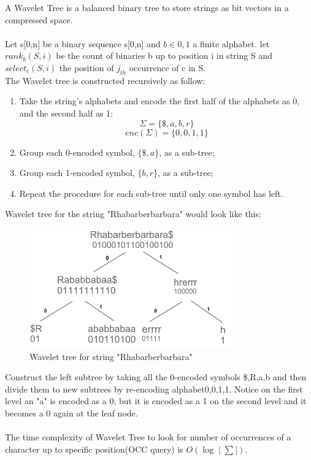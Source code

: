 \documentclass[11pt,a4paper]{report}
\begin{document}
A Wavelet Tree is a balanced binary tree to store strings as bit vectors in a 
compressed space\cite{navarroWavelet}\cite{Wavthesis}\cite{AlexBowe}.\\\\
Let s[0,n] be a binary sequence s[0,n] and $b \in {0,1}$ a finite alphabet. 
let $ rank_{b}(S, i)$ be the count of binaries b up to position i in string S 
and $ select_{c}(S,i)$  the position of $j_{th}$ occurrence of c in S.\\
The Wavelet tree is constructed recursively as follow:
\begin{enumerate}
    \item
		Take the string's alphabets and encode the first half of the alphabets as 0, and the second half as 1\cite {AlexBowe}:
    		$$\Sigma = \{ \$, a, b, r \}$$
			$$enc(\Sigma) = \{ 0, 0, 1, 1 \}$$
    \item
		Group each 0-encoded symbol, $\{ \$, a \}$, as a sub-tree;
    \item
		Group each 1-encoded symbol, $\{ b , r\}$, as a sub-tree;
    \item
		Repeat the procedure for each sub-tree until only one symbol has left.
\end{enumerate}
Wavelet tree for the string "Rhabarberbarbara" would look like this:
\begin{figure}[H]
\centering
\includegraphics[width=9cm]{pictures/wavelet.png}
\caption{Wavelet tree for string "Rhabarberbarbara"}
\label{fig:barbWavlet}
\end{figure}

Construct the left subtree by taking all the 0-encoded symbols {\$,R,a,b} and
then divide them to new subtrees by re-encoding alphabet{0,0,1,1}.
Notice on the first level an "a" is encoded as a 0, but it is encoded as a 
1 on the second level and it becomes a 0 again at the leaf node.\\\\
The time complexity of Wavelet Tree to look for number of occurrences of a 
character up to specific position(OCC query) is $O(\log{}\mid\sum\mid)$.
\end{document}
